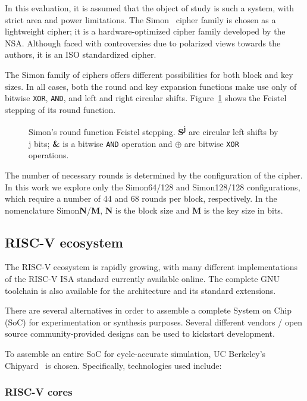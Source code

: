 \documentclass[10pt,conference]{IEEEtran}
\begin{document}
In this evaluation, it is assumed that the object of study is such a system,
with strict area and power limitations. The Simon~\cite{Beaulieu2015} cipher family is chosen as a
lightweight cipher; it is a hardware-optimized cipher family developed by the
NSA. Although faced with controversies due to polarized views towards the
authors, it is an ISO standardized cipher.

The Simon family of ciphers offers different possibilities for both block and
key sizes. In all cases, both the round and key expansion functions make use
only of bitwise \texttt{XOR}, \texttt{AND}, and left and right circular shifts.
Figure~\ref{fig:simonround} shows the Feistel stepping of its round function.

\begin{figure}
  \centering
  
  \caption{Simon's round function Feistel stepping. \textbf{S\textsuperscript{j}} are
    circular left shifts by j bits; \textbf{\&} is a bitwise \texttt{AND}
    operation and $\oplus$ are bitwise \texttt{XOR} operations.}
  \label{fig:simonround}
\end{figure}

The number of necessary rounds is determined by the configuration of the cipher.
In this work we explore only the Simon64/128 and Simon128/128 configurations,
which require a number of 44 and 68 rounds per block, respectively.
In the nomenclature Simon\textbf{N}/\textbf{M}, \textbf{N} is the block size and
\textbf{M} is the key size in bits.

\subsection{RISC-V ecosystem}

The RISC-V ecosystem is rapidly growing, with many different implementations of
the RISC-V ISA standard currently available online. The complete GNU toolchain
is also available for the architecture and its standard extensions.

There are several alternatives in order to assemble a complete System on Chip
(SoC) for experimentation or synthesis purposes. Several different vendors /
open source community-provided designs can be used to kickstart development.

To assemble an entire SoC for cycle-accurate simulation, UC Berkeley's Chipyard~\cite{Chipyard}
is chosen. Specifically, technologies used include:

\subsubsection{RISC-V cores}
\end{document}
